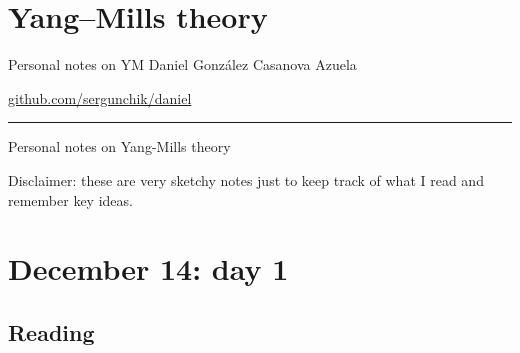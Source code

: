 
\section{Yang--Mills theory}

\begin{minipage}{\textwidth}
	\begin{minipage}{1\textwidth}
		Personal notes on YM \hfill Daniel González Casanova Azuela
		
  {\small
  \hfill\href{https://github.com/sergunchik/daniel}{github.com/sergunchik/daniel}}
	\end{minipage}
\end{minipage}\vspace{.2cm}\hrule

\vspace{10pt}
{\huge Personal notes on Yang-Mills theory}

Disclaimer: these are very sketchy notes just to keep track of what I read and
remember key ideas.

\section{December 14: day 1}

\subsection{Reading \cite{reportdouglas}}

